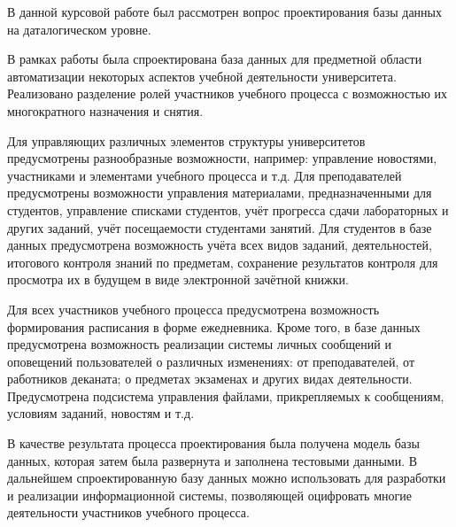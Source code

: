 
В данной курсовой работе был рассмотрен вопрос проектирования базы данных на даталогическом уровне. 

В рамках работы была спроектирована база данных для предметной области автоматизации некоторых аспектов учебной деятельности университета. Реализовано разделение ролей участников учебного процесса с  возможностью их многократного назначения и снятия. 

Для управляющих различных элементов структуры университетов \\предусмотрены разнообразные возможности, например: управление новостями, участниками и элементами учебного процесса и т.д. Для преподавателей предусмотрены возможности управления материалами, предназначенными для студентов, управление списками студентов, учёт прогресса сдачи лабораторных и других заданий, учёт посещаемости студентами занятий. Для студентов в базе данных предусмотрена возможность учёта всех видов заданий, деятельностей, итогового контроля знаний по предметам, сохранение результатов контроля для просмотра их в будущем в виде электронной зачётной книжки. 

Для всех участников учебного процесса предусмотрена возможность формирования расписания в форме ежедневника. Кроме того, в базе данных предусмотрена возможность реализации системы личных сообщений и оповещений пользователей о различных изменениях: от преподавателей, от работников деканата; о предметах экзаменах и других видах деятельности. Предусмотрена подсистема управления файлами, прикрепляемых к сообщениям, условиям заданий, новостям и т.д.

В качестве результата процесса проектирования была получена модель базы данных, которая затем была развернута и заполнена тестовыми данными. В дальнейшем спроектированную базу данных можно использовать для разработки и реализации информационной системы, позволяющей оцифровать многие деятельности участников учебного процесса. 
